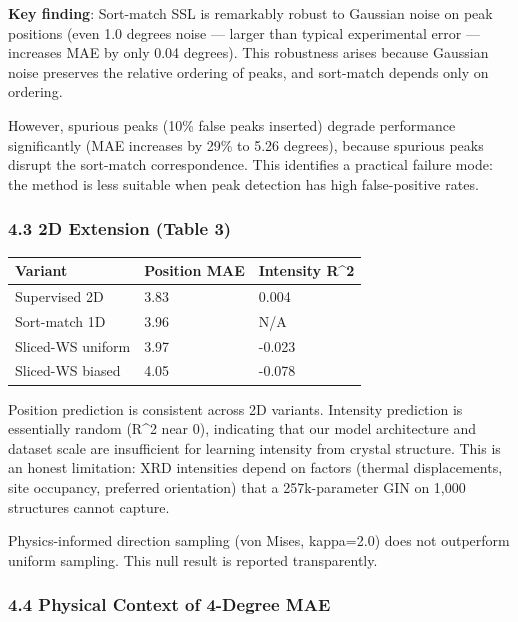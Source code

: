 \documentclass[
  11pt,
]{article}
\newcounter{none} %
\begin{document}
\textbf{Key finding}: Sort-match SSL is remarkably robust to Gaussian
noise on peak positions (even 1.0 degrees noise --- larger than typical
experimental error --- increases MAE by only 0.04 degrees). This
robustness arises because Gaussian noise preserves the relative ordering
of peaks, and sort-match depends only on ordering.

However, spurious peaks (10\% false peaks inserted) degrade performance
significantly (MAE increases by 29\% to 5.26 degrees), because spurious
peaks disrupt the sort-match correspondence. This identifies a practical
failure mode: the method is less suitable when peak detection has high
false-positive rates.

\subsubsection{4.3 2D Extension (Table 3)}\label{d-extension-table-3}

{\def\LTcaptype{none} %
\begin{longtable}[]{@{}lll@{}}
\toprule\noalign{}
Variant & Position MAE & Intensity R\^{}2 \\
\midrule\noalign{}
\endhead
\bottomrule\noalign{}
\endlastfoot
Supervised 2D & 3.83 & 0.004 \\
Sort-match 1D & 3.96 & N/A \\
Sliced-WS uniform & 3.97 & -0.023 \\
Sliced-WS biased & 4.05 & -0.078 \\
\end{longtable}
}

Position prediction is consistent across 2D variants. Intensity
prediction is essentially random (R\^{}2 near 0), indicating that our
model architecture and dataset scale are insufficient for learning
intensity from crystal structure. This is an honest limitation: XRD
intensities depend on factors (thermal displacements, site occupancy,
preferred orientation) that a 257k-parameter GIN on 1,000 structures
cannot capture.

Physics-informed direction sampling (von Mises, kappa=2.0) does not
outperform uniform sampling. This null result is reported transparently.

\subsubsection{4.4 Physical Context of 4-Degree
MAE}\label{physical-context-of-4-degree-mae}
\end{document}
